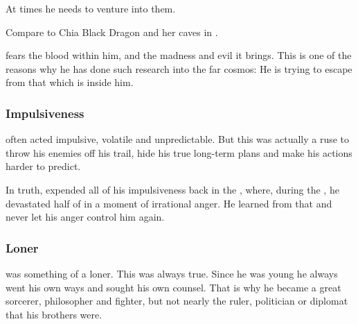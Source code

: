 At times he needs to venture into them. 

Compare to Chia Black Dragon and her caves in \cite[p.120-150]{StephenMarley:ShadowSisters}. 

\Ishnaruchaefir{} fears the \xsic{} blood within him, and the madness and evil it brings. 
This is one of the reasons why he has done such research into the far cosmos: 
He is trying to escape from that which is inside him.






\subsubsection{Impulsiveness}
\Ishnaruchaefir{} often acted impulsive, volatile and unpredictable. 
But this was actually a ruse to throw his enemies off his trail, hide his true long-term plans and make his actions harder to predict. 

In truth, \Ishnaruchaefir{} expended all of his impulsiveness back in the \secondbanewar, where, during the \SecondShrouding, he devastated half of \Miith{} in a moment of irrational anger. 
He learned from that and never let his anger control him again.





\subsubsection{Loner}
\Ishnaruchaefir{} was something of a loner. 
This was always true. 
Since he was young he always went his own ways and sought his own counsel. 
That is why he became a great sorcerer, philosopher and fighter, but not nearly the ruler, politician or diplomat that his brothers were. 

